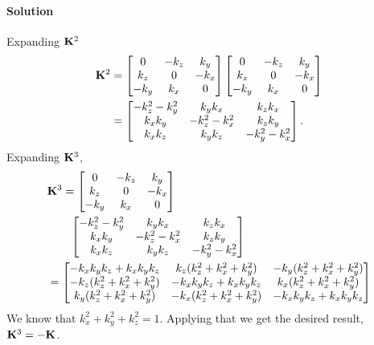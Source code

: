 \documentclass{article}
\begin{document}
\paragraph*{Solution}
Expanding $\mathbf{K}^2$
\begin{align}
  \mathbf{K}^2 &= \begin{bmatrix}
    0 & -k_z & k_y \\
    k_z & 0 & -k_x \\
    -k_y & k_x & 0
  \end{bmatrix}
                 \begin{bmatrix}
                   0 & -k_z & k_y \\
                   k_z & 0 & -k_x \\
                   -k_y & k_x & 0
                 \end{bmatrix}
  \\
         &= \begin{bmatrix}
           -k_z^2 - k_y^2  & k_y k_x & k_z k_x \\
           k_xk_y & -k_z^2 - k_x^2 & k_z k_y \\
           k_x k_z & k_y k_z & -k_y^2 - k_x^2
         \end{bmatrix}.
\end{align}
Expanding $\mathbf{K}^3$,
\begin{align}
  &\mathbf{K}^3 = \begin{bmatrix}
    0 & -k_z & k_y \\
    k_z & 0 & -k_x \\
    -k_y & k_x & 0
  \end{bmatrix}
                 \notag\\&\qquad
         \begin{bmatrix}
           -k_z^2 - k_y^2  & k_y k_x & k_z k_x \\
           k_xk_y & -k_z^2 - k_x^2 & k_z k_y \\
           k_x k_z & k_y k_z & -k_y^2 - k_x^2
         \end{bmatrix}
  \\&=
  \begin{bmatrix}
    -k_xk_yk_z +k_xk_yk_z & k_z (k_z^2 + k_x^2 + k_y^2) & -k_y (k_z^2 + k_x^2 + k_y^2)\\
    -k_z (k_z^2 + k_x^2 + k_y^2) & -k_xk_yk_z +k_xk_yk_z & k_x (k_z^2 + k_x^2 + k_y^2)\\
    k_y (k_z^2 + k_x^2 + k_y^2) & -k_x (k_z^2 + k_x^2 + k_y^2) & -k_xk_yk_z +k_xk_yk_z
    \end{bmatrix}
\end{align}
We know that $k_x^2 + k_y^2 + k_z^2 = 1$. Applying that we get the desired
result, $\mathbf{K}^3 = - \mathbf{K}$.
\end{document}
